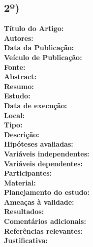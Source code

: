 \documentclass[12pt,a4paper]{article}
\begin{document}
\subsection*{2º)}
\noindent \textbf{Título do Artigo:} \hrulefill \\
\textbf{Autores:} \hrulefill \\
\textbf{Data da Publicação:} \hrulefill \\
\textbf{Veículo de Publicação:} \hrulefill \\
\textbf{Fonte:} \hrulefill \\
\textbf{Abstract:} \hrulefill \\
\textbf{Resumo:} \hrulefill \\
\textbf{Estudo:} \hrulefill \\
\textbf{Data de execução:} \hrulefill \\
\textbf{Local:} \hrulefill \\
\textbf{Tipo:} \hrulefill \\
\textbf{Descrição:} \hrulefill \\
\textbf{Hipóteses avaliadas:} \hrulefill \\
\textbf{Variáveis independentes:} \hrulefill \\
\textbf{Variáveis dependentes:} \hrulefill \\
\textbf{Participantes:} \hrulefill \\
\textbf{Material:} \hrulefill \\
\textbf{Planejamento do estudo:} \hrulefill \\
\textbf{Ameaças à validade:} \hrulefill \\
\textbf{Resultados:} \hrulefill \\
\textbf{Comentários adicionais:} \hrulefill \\
\textbf{Referências relevantes:} \hrulefill \\
\textbf{Justificativa:} \hrulefill

\vspace{1cm}
\end{document}

